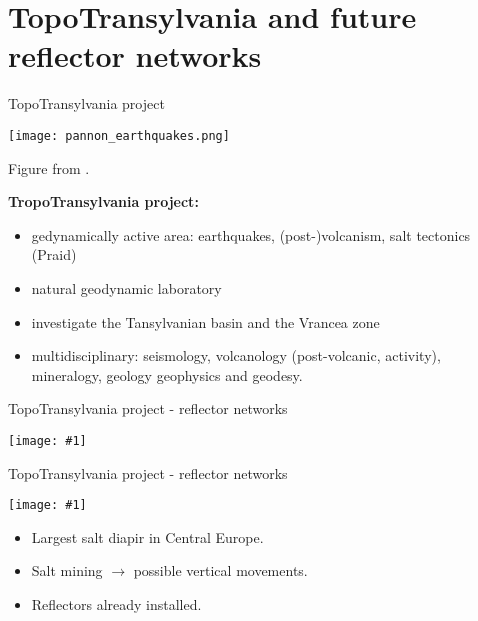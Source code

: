 \documentclass[aspectratio=169]{beamer}
\newcommand{\ffig}[1]{
    \begin{mdframed}[linecolor=red!50!black, linewidth=2pt, roundcorner=2.25pt,
                     innerrightmargin=0pt, innerleftmargin=0pt,
                     innertopmargin=0pt, innerbottommargin=0pt,
                     backgroundcolor=white, frametitle={}, align=center]
        \texttt{[image: \#1]}
    \end{mdframed}
}
\begin{document}
\section{TopoTransylvania and future reflector networks}

\begin{frame}{TopoTransylvania project}
    \begin{minipage}[c]{0.54\textwidth}
        \texttt{[image: pannon\_earthquakes.png]}
        
        Figure from \cite{Matenco2018}.
    \end{minipage}
    \begin{minipage}[c]{0.45\textwidth}
        \pause
        \textbf{TropoTransylvania project:}
        \begin{itemize}
            \pause
            \item gedynamically active area: earthquakes, (post-)volcanism, salt tectonics (Praid)
            \pause
            \item natural geodynamic laboratory
            \pause
            \item investigate the Tansylvanian basin and the Vrancea zone
            \pause
            \item multidisciplinary: \pause seismology, \pause volcanology (post-volcanic, activity),
                  \pause mineralogy, \pause geology \pause geophysics \pause and geodesy.
        \end{itemize}
    \end{minipage}
\end{frame}

\begin{frame}{TopoTransylvania project - reflector networks}
    \begin{minipage}[c]{0.625\textwidth}
        \ffig{praid_ciomadul.png}
    \end{minipage}
    \hspace{10pt}
    \begin{minipage}[c]{0.275\textwidth}
    \end{minipage}
\end{frame}

\begin{frame}{TopoTransylvania project - reflector networks}
    \begin{minipage}[c]{0.625\textwidth}
        \ffig{parajd_3D_mod.png}
    \end{minipage}
    \hspace{10pt}
    \begin{minipage}[c]{0.275\textwidth}
        \begin{itemize}
            \pause
            \item Largest salt diapir in Central Europe.
            \pause
            \item Salt mining $\rightarrow$ possible vertical movements.
            \pause
            \item Reflectors already installed.
        \end{itemize}
    \end{minipage}
\end{frame}
\end{document}
